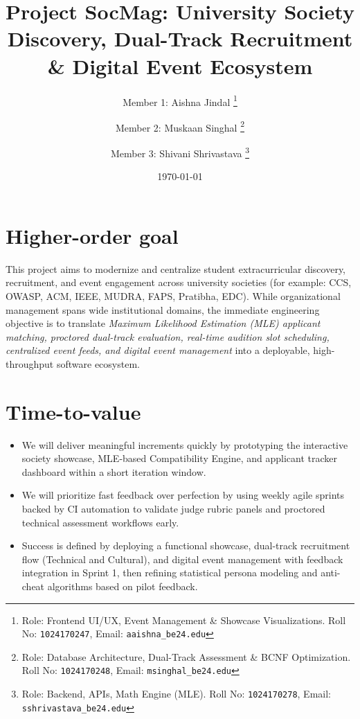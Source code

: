\documentclass[11pt,a4paper]{article}
\title{Project SocMag: University Society Discovery, Dual-Track Recruitment \& Digital Event Ecosystem}
\author{
  Member 1: Aishna Jindal%
  \thanks{Role: Frontend UI/UX, Event Management \& Showcase Visualizations. Roll No: \texttt{1024170247}, %
    Email: \texttt{aaishna\_be24\@thapar.edu}}
  \and 
  Member 2: Muskaan Singhal%
  \thanks{Role: Database Architecture, Dual-Track Assessment \& BCNF Optimization. Roll No: \texttt{1024170248}, %
    Email: \texttt{msinghal\_be24\@thapar.edu}}
  \and 
  Member 3: Shivani Shrivastava%
  \thanks{Role: Backend, APIs, Math Engine (MLE). Roll No: \texttt{1024170278}, %
    Email: \texttt{sshrivastava\_be24\@thapar.edu}}
}
\date{\today}
\begin{document}
\maketitle

\section{Higher-order goal}
This project aims to modernize and centralize student extracurricular discovery, recruitment, and event engagement across university societies (for example: CCS, OWASP, ACM, IEEE, MUDRA, FAPS, Pratibha, EDC). While organizational management spans wide institutional domains, the immediate engineering objective is to translate \emph{Maximum Likelihood Estimation (MLE) applicant matching, proctored dual-track evaluation, real-time audition slot scheduling, centralized event feeds, and digital event management} into a deployable, high-throughput software ecosystem.

\section{Time-to-value}
\begin{itemize}[leftmargin=0.7cm]
    \item We will deliver meaningful increments quickly by prototyping the interactive society showcase, MLE-based Compatibility Engine, and applicant tracker dashboard within a short iteration window.
    \item We will prioritize fast feedback over perfection by using weekly agile sprints backed by CI automation to validate judge rubric panels and proctored technical assessment workflows early.
    \item Success is defined by deploying a functional showcase, dual-track recruitment flow (Technical and Cultural), and digital event management with feedback integration in Sprint 1, then refining statistical persona modeling and anti-cheat algorithms based on pilot feedback.
\end{itemize}
\end{document}
